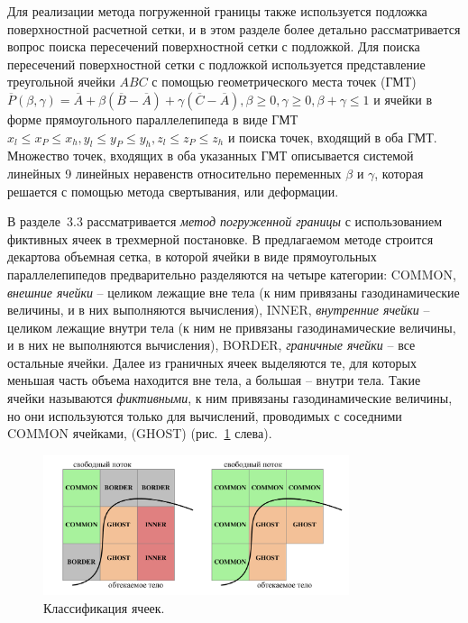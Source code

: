 \documentclass[a4paper,14pt]{extarticle}                     %
\theoremstyle{plain}                                         %
\begin{document}
Для реализации метода погруженной границы также используется подложка поверхностной расчетной сетки, и в этом разделе более детально рассматривается вопрос поиска пересечений поверхностной сетки с подложкой.
Для поиска пересечений поверхностной сетки с подложкой используется представление треугольной ячейки $ABC$ с помощью геометрического места точек (ГМТ) $\overline{P}(\beta, \gamma) = \overline{A} + \beta (\overline{B} - \overline{A}) + \gamma (\overline{C} - \overline{A}), \beta \ge 0, \gamma \ge 0, \beta + \gamma \le 1$ и ячейки в форме прямоугольного параллелепипеда в виде ГМТ $x_l \le x_P \le x_h, y_l \le y_P \le y_h, z_l \le z_P \le z_h$ и поиска точек, входящий в оба ГМТ.
Множество точек, входящих в оба указанных ГМТ описывается системой линейных 9 линейных неравенств относительно переменных $\beta$ и $\gamma$, которая решается с помощью метода свертывания, или деформации.


В разделе~3.3 рассматривается \textit{метод погруженной границы} с использованием фиктивных ячеек в трехмерной постановке.
В предлагаемом методе строится декартова объемная сетка, в которой ячейки в виде прямоугольных параллелепипедов предварительно разделяются на четыре категории:
COMMON, \textit{внешние ячейки} -- целиком лежащие вне тела (к ним привязаны газодинамические величины, и в них выполняются вычисления), INNER, \textit{внутренние ячейки} -- целиком лежащие внутри тела (к ним не привязаны газодинамические величины, и в них не выполняются вычисления), BORDER, \textit{граничные ячейки} -- все остальные ячейки.
Далее из граничных ячеек выделяются те, для которых меньшая часть объема находится вне тела, а большая -- внутри тела.
Такие ячейки называются \textit{фиктивными}, к ним привязаны газодинамические величины, но они используются только для вычислений, проводимых с соседними COMMON ячейками, (GHOST) (рис.~\ref{fig:text_1_immersed_boundary_method_class} слева).

\begin{figure}[ht]
\centering
\includegraphics[width=0.8\textwidth]{fig/int_cells_classification_big.pdf}
\singlespacing
\caption{Классификация ячеек.}
\label{fig:text_1_immersed_boundary_method_class}
\end{figure}
\end{document}
